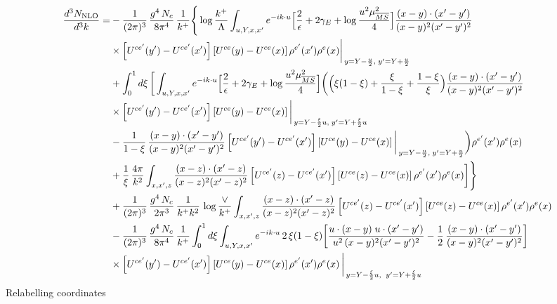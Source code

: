 \documentclass[9pt]{article}
\numberwithin{equation}{section}
\begin{document}
\begin{align}
\frac{d^{3}N_{\rm NLO}}{d^{3}k}= &-\frac{1}{(2\pi)^{3}}\,\frac{g^{4}\,N_{c}}{8\pi^{4}}\,\frac{1}{k^{+}}\Bigg\{\log\frac{k^{+}}{\Lambda}\int_{u,Y,x,x'}e^{-ik\cdot u}\Big[\frac{2}{\epsilon}+2\gamma_{E}+\log\frac{u^{2}\mu^{2}_{\overline{MS}}}{4}\Big]\frac{(x-y)\cdot(x'-y')}{(x-y)^{2}(x'-y')^{2}}\notag\\
&\times\left[U^{ce'}(y') - U^{ce'}(x')\right]\left[U^{ce}(y) - U^{ce}(x)\right]\rho^{e'}(x')\rho^{e}(x)\bigg|_{\,y=Y-\frac{u}{2},\;y'=Y+\frac{u}{2}}\notag\\
&+\int_{0}^{1}d\xi\,\bigg[\int_{u,Y,x,x'}e^{-ik\cdot u}\Big[\frac{2}{\epsilon}+2\gamma_{E}+\log\frac{u^{2}\mu^{2}_{\overline{MS}}}{4}\Big]\bigg(\Big(\xi(1-\xi)+\frac{\xi}{1-\xi}+\frac{1-\xi}{\xi}\Big)\frac{(x-y)\cdot(x'-y')}{(x-y)^{2}(x'-y')^{2}}\notag\\
&\times\left[U^{ce'}(y') - U^{ce'}(x')\right]\left[U^{ce}(y) - U^{ce}(x)\right]\bigg|_{\,y=Y-\frac{\xi}{2}u,\;y'=Y+\frac{\xi}{2}u}\notag\\
&-\frac{1}{1-\xi}\,\frac{(x-y)\cdot(x'-y')}{(x-y)^{2}(x'-y')^{2}}\left[U^{ce'}(y') - U^{ce'}(x')\right]\left[U^{ce}(y) - U^{ce}(x)\right]\bigg|_{\,y=Y-\frac{u}{2},\;y'=Y+\frac{u}{2}}\bigg)\rho^{e'}(x')\rho^{e}(x)\notag\\
&+\frac{1}{\xi}\,\frac{4\pi}{k^{2}}\int_{x,x',z}\frac{(x-z)\cdot(x'-z)}{(x-z)^{2}(x'-z)^{2}}\left[U^{ce'}(z) - U^{ce'}(x')\right]\left[U^{ce}(z) - U^{ce}(x)\right]\rho^{e'}(x')\rho^{e}(x)\bigg]\Bigg\}\notag\\
&+\frac{1}{(2\pi)^{3}}\,\frac{g^{4}\,N_{c}}{2\pi^{3}}\,\frac{1}{k^{+}k^{2}}\,\log\frac{\vee}{k^{+}}\int_{x,x',z}\frac{(x-z)\cdot(x'-z)}{(x-z)^{2}(x'-z)^{2}}\left[U^{ce'}(z) - U^{ce'}(x')\right]\left[U^{ce}(z) - U^{ce}(x)\right]\rho^{e'}(x')\rho^{e}(x)\notag\\
&-\frac{1}{(2\pi)^{3}}\,\frac{g^{4}\,N_{c}}{8\pi^{4}}\,\frac{1}{k^{+}}\int_{0}^{1}d\xi\int_{u,Y,x,x'}e^{-ik\cdot u}\,2\,\xi(1-\xi)\bigg[\frac{u\cdot(x-y)\;u\cdot(x'-y')}{u^{2}\,(x-y)^{2}(x'-y')^{2}}-\frac{1}{2}\,\frac{(x-y)\cdot(x'-y')}{(x-y)^{2}(x'-y')^{2}}\bigg]\notag\\
&\times\left[U^{ce'}(y') - U^{ce'}(x')\right]\left[U^{ce}(y) - U^{ce}(x)\right]\rho^{e'}(x')\rho^{e}(x)\,\bigg|_{\,y=Y-\frac{\xi}{2}u,\;\;y'=Y+\frac{\xi}{2}u}
\end{align}
Relabelling coordinates
\end{document}
